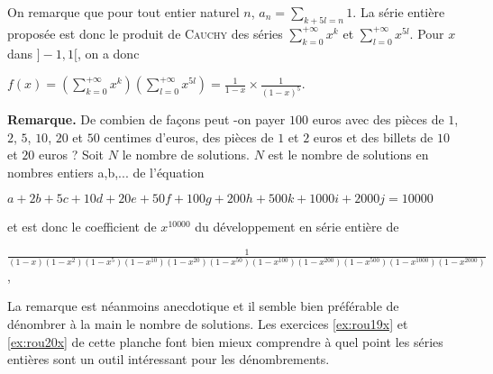 {{\begin{enumerate}
On remarque que pour tout entier naturel $n$, $a_n =\sum_{k+5l=n}^{}1$. La série entière proposée est donc le produit de \textsc{Cauchy} des séries $\sum_{k=0}^{+\infty}x^k$ et $\sum_{l=0}^{+\infty}x^{5l}$. Pour $x$ dans $]-1,1[$, on a donc

\begin{center}
$f(x) =\left(\sum_{k=0}^{+\infty}x^k\right)\left(\sum_{l=0}^{+\infty}x^{5l}\right)=\frac{1}{1-x}\times\frac{1}{(1-x)^5}$.
\end{center}

\textbf{Remarque.} De combien de façons peut -on payer $100$ euros avec des pièces de $1$, $2$, $5$, $10$, $20$ et $50$ centimes d'euros, des pièces de $1$ et $2$ euros et des billets de $10$ et $20$ euros ? Soit $N$ le nombre de solutions. $N$ est le nombre de solutions en nombres entiers a,b,... de l'équation

\begin{center}
$a +2b +5c +10d +20e +50f +100g +200h+500k+1000i+2000j=10000$
\end{center}

et est donc le coefficient de $x^{10000}$ du développement en série entière de 

\begin{center}
$\frac{1}{(1-x)(1-x^2)(1-x^5)(1-x^{10})(1-x^{20})(1-x^{50})(1-x^{100})(1-x^{200})(1-x^{500})(1-x^{1000})(1-x^{2000})}$,
\end{center}

La remarque est néanmoins anecdotique et il semble bien préférable de dénombrer à la main le nombre de solutions. Les 
exercices \ref{ex:rou19x} et \ref{ex:rou20x} de cette planche font bien mieux comprendre à quel point les séries entières sont un outil intéressant pour les dénombrements.
\end{enumerate}}
}